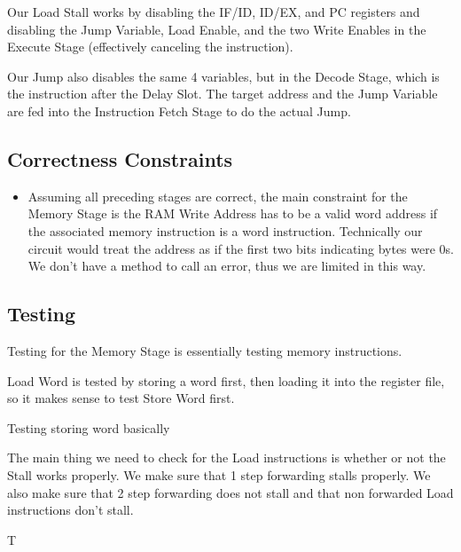 \documentclass{article}
\begin{document}
Our Load Stall works by disabling the IF/ID, ID/EX, and PC registers and disabling the Jump Variable, Load Enable, and the two Write Enables in the Execute Stage (effectively canceling the instruction). 

Our Jump also disables the same 4 variables, but in the Decode Stage, which is the instruction after the Delay Slot. The target address and the Jump Variable are fed into the Instruction Fetch Stage to do the actual Jump.

\subsection{Correctness Constraints}
\begin{itemize}
\item
Assuming all preceding stages are correct, the main constraint for the Memory Stage is the RAM Write Address has to be a valid word address if the associated memory instruction is a word instruction. Technically our circuit would treat the address as if the first two bits indicating bytes were 0s. We don't have a method to call an error, thus we are limited in this way.
\end{itemize}

\subsection{Testing}
Testing for the Memory Stage is essentially testing memory instructions.

Load Word is tested by storing a word first, then loading it into the register file, so it makes sense to test Store Word first.

Testing storing word basically 

The main thing we need to check for the Load instructions is whether or not the Stall works properly. We make sure that 1 step forwarding stalls properly. We also make sure that 2 step forwarding does not stall and that non forwarded Load instructions don't stall. 

T  
\end{document}
